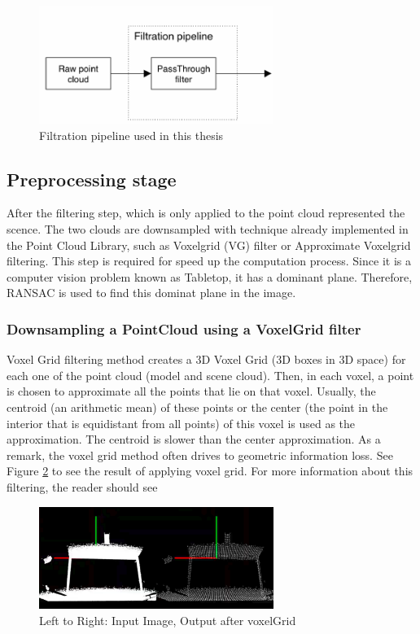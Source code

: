 \begin{figure}[!h]
\begin{center}
\includegraphics[width=3in]{figures03/passthrough.png}
\caption{Filtration pipeline used in this thesis}%
\label{fig:passthrough}
\end{center}
\end{figure}


\subsection{Preprocessing stage}

After the filtering step, which is only applied to the point cloud represented the scence. The two clouds are downsampled with technique already implemented in the Point Cloud Library, such as Voxelgrid (VG) filter or Approximate Voxelgrid filtering. This step is required for speed up the computation process. 
Since it is a computer vision problem known as Tabletop, it has a dominant plane. Therefore, RANSAC is used to find this dominat plane in the image. 

\subsubsection{Downsampling a PointCloud using a VoxelGrid filter}

Voxel Grid filtering method \cite{algFiltering} creates a 3D Voxel Grid
(3D boxes in 3D space) for each one of the point cloud (model and scene cloud). Then, in each voxel, a point is chosen to approximate all the points that lie on that voxel. Usually, the centroid (an arithmetic mean) of these points or the center (the point in the interior that is equidistant from all points) of this voxel is used as the approximation. The centroid is slower than the center approximation. As a remark, the voxel grid method often drives to geometric information loss. See Figure \ref{fig:voxeldown} to see the result of applying voxel grid. For more information about this filtering, the reader should see \cite{algDownsampling}


\begin{figure}[!h]
\begin{center}
\includegraphics[width=3in]{figures03/voxelcloud1.png}
\caption{Left to Right: Input Image, Output after voxelGrid}%
\label{fig:voxeldown}
\end{center}
\end{figure}


